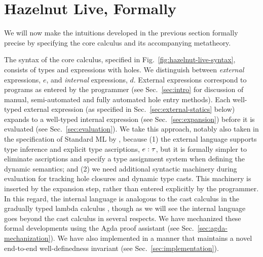 
\clearpage
\newcommand{\calculusSec}{Hazelnut Live, Formally}
\section{\protect\calculusSec}
\label{sec:calculus}



We will now make the intuitions developed in the previous section formally precise by specifying the \HazelnutLive core calculus and  its accompanying metatheory. 

The syntax of the core calculus, specified in Fig.~\ref{fig:hazelnut-live-syntax}, consists of types and expressions with holes. 
We distinguish between \emph{external} expressions, $e$, and \emph{internal} expressions, $d$. 
External expressions correspond to programs as entered by the programmer 
(see Sec.~\ref{sec:intro} for discussion of manual, semi-automated and fully automated hole entry methods). 
Each well-typed external expression (as specified in Sec.~\ref{sec:external-statics} below) expands to a well-typed internal expression (see Sec.~\ref{sec:expansion}) before it is evaluated (see Sec.~\ref{sec:evaluation}). 
We take this approach, notably also taken in the specification of Standard ML by \citet{Harper00atype-theoretic}, because (1) the external language supports type inference and explicit type ascriptions, $e : \tau$, but it is formally simpler to eliminate ascriptions and specify a type assignment system when defining the dynamic semantics; and 
(2) we need additional syntactic machinery during evaluation for tracking hole closures and dynamic type casts. 
This machinery is inserted by the expansion step, rather than entered explicitly by the programmer. 
In this regard, the internal language is analogous to the cast calculus in the gradually typed lambda calculus \cite{DBLP:conf/snapl/SiekVCB15,Siek06a}, though as we will see the \HazelnutLive internal language goes beyond the cast calculus in several respects. We have mechanized these formal developments using the Agda proof assistant \cite{norell:thesis,norell2009dependently} 
(see Sec.~\ref{sec:agda-mechanization}). We have also implemented \HazelnutLive in a manner that maintains a novel end-to-end well-definedness invariant (see Sec.~\ref{sec:implementation}).


